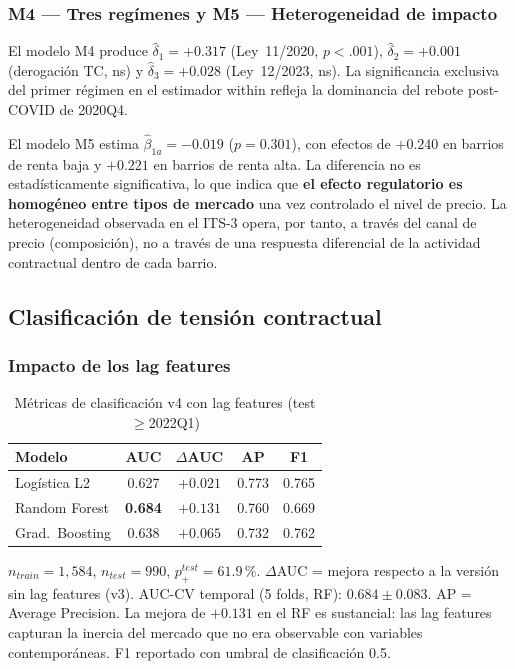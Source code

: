 \documentclass[10pt,a4paper,twocolumn]{article}
\begin{document}
\subsubsection{M4 — Tres regímenes y M5 — Heterogeneidad de impacto}

El modelo M4 produce $\hat\delta_1{=}+0.317$ (Ley~11/2020, $p{<}.001$),
$\hat\delta_2{=}+0.001$ (derogación TC, ns) y $\hat\delta_3{=}+0.028$ (Ley~12/2023, ns).
La significancia exclusiva del primer régimen en el estimador within refleja la
dominancia del rebote post-COVID de 2020Q4.

El modelo M5 estima $\hat\beta_{1a}{=}-0.019$ ($p{=}0.301$), con efectos de
$+0.240$ en barrios de renta baja y $+0.221$ en barrios de renta alta. La diferencia
no es estadísticamente significativa, lo que indica que \textbf{el efecto regulatorio
es homogéneo entre tipos de mercado} una vez controlado el nivel de precio. La
heterogeneidad observada en el ITS-3 opera, por tanto, a través del canal de precio
(composición), no a través de una respuesta diferencial de la actividad contractual
dentro de cada barrio.

\subsection{Clasificación de tensión contractual}

\subsubsection{Impacto de los lag features}

\begin{table}[H]
\caption{Métricas de clasificación v4 con lag features (test $\geq$2022Q1)}
\label{tab:clf_v4}
\centering\small
\begin{threeparttable}
\begin{tabular}{lcccc}
\toprule
Modelo & AUC & $\Delta$AUC & AP & F1 \\
\midrule
Logística L2   & 0.627 & $+0.021$ & 0.773 & 0.765 \\
Random Forest  & \textbf{0.684} & $\mathbf{+0.131}$ & 0.760 & 0.669 \\
Grad.\ Boosting& 0.638 & $+0.065$ & 0.732 & 0.762 \\
\bottomrule
\end{tabular}
\begin{tablenotes}\small
\item $n_{train}{=}1{,}584$, $n_{test}{=}990$, $p_{+}^{test}{=}61.9$\,\%.
$\Delta$AUC = mejora respecto a la versión sin lag features (v3).
AUC-CV temporal (5 folds, RF): $0.684 \pm 0.083$.
AP = Average Precision. La mejora de $+0.131$ en el RF es sustancial: las lag features
capturan la inercia del mercado que no era observable con variables contemporáneas.
F1 reportado con umbral de clasificación 0.5.
\end{tablenotes}
\end{threeparttable}
\end{table}
\end{document}
